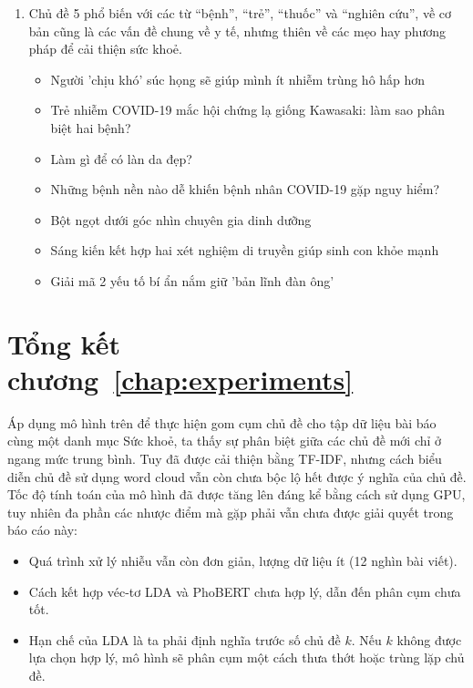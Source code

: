 \begin{enumerate}


    \item Chủ đề 5 phổ biến với các từ ``bệnh'', ``trẻ'', ``thuốc'' và ``nghiên cứu'',
        về cơ bản cũng là các vấn đề chung về y tế, nhưng thiên về các mẹo hay phương pháp để cải thiện sức khoẻ.
        \begin{itemize}
            \item Người 'chịu khó' súc họng sẽ giúp mình ít nhiễm trùng hô hấp hơn
            \item Trẻ nhiễm COVID-19 mắc hội chứng lạ giống Kawasaki: làm sao phân biệt hai bệnh?
            \item Làm gì để có làn da đẹp?
            \item Những bệnh nền nào dễ khiến bệnh nhân COVID-19 gặp nguy hiểm?
            \item Bột ngọt dưới góc nhìn chuyên gia dinh dưỡng
            \item Sáng kiến kết hợp hai xét nghiệm di truyền giúp sinh con khỏe mạnh
            \item Giải mã 2 yếu tố bí ẩn nắm giữ 'bản lĩnh đàn ông'
        \end{itemize}
\end{enumerate}


\section{Tổng kết chương~\ref{chap:experiments}}
Áp dụng mô hình trên để thực hiện gom cụm chủ đề cho tập dữ liệu bài báo cùng
một danh mục Sức khoẻ, ta thấy sự phân biệt giữa các chủ đề mới chỉ ở ngang mức
trung bình. Tuy đã được cải thiện bằng TF-IDF, nhưng cách biểu diễn chủ đề sử
dụng word cloud vẫn còn chưa bộc lộ hết được ý nghĩa của chủ đề. Tốc độ tính
toán của mô hình đã được tăng lên đáng kể bằng cách sử dụng GPU, tuy nhiên đa
phần các nhược điểm mà \cite{lamGomCumVan2021} gặp phải vẫn chưa được giải
quyết trong báo cáo này:

\begin{itemize}
    \item Quá trình xử lý nhiễu vẫn còn đơn giản, lượng dữ liệu ít (12 nghìn
        bài viết).
    \item Cách kết hợp véc-tơ LDA và PhoBERT chưa hợp lý, dẫn đến phân cụm chưa
        tốt.
    \item Hạn chế của LDA là ta phải định nghĩa trước số chủ đề $k$. Nếu $k$
        không được lựa chọn hợp lý, mô hình sẽ phân cụm một cách thưa thớt hoặc
        trùng lặp chủ đề.
\end{itemize}


